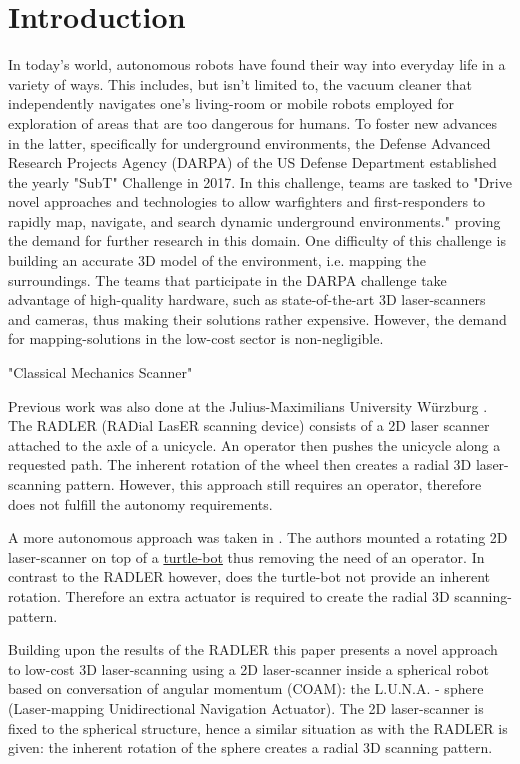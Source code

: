 \section{Introduction}
\label{sec:introduction}

In today's world, autonomous robots have found their way into everyday life in a variety of ways. This includes, but isn't limited to, the vacuum cleaner that independently navigates one's living-room or mobile robots employed for exploration of areas that are too dangerous for humans. To foster new advances in the latter, specifically for underground environments, the  Defense Advanced Research Projects Agency (DARPA) of the US Defense Department established the yearly "SubT" Challenge in 2017. In this challenge, teams are tasked to "Drive novel approaches and technologies to allow warfighters and first-responders to rapidly map, navigate, and search dynamic underground environments."  \cite{allen} proving the demand for further research in this domain. One difficulty of this challenge is building an accurate 3D model of the environment, i.e. mapping the surroundings. The teams that participate in the DARPA challenge take advantage of high-quality hardware, such as state-of-the-art 3D laser-scanners and cameras, thus making their solutions rather expensive. However, the demand for mapping-solutions in the low-cost sector is non-negligible. 

"Classical Mechanics Scanner" \cite{classical_mechanics_scanner}

Previous work was also done at the Julius-Maximilians University W\"urzburg \cite{ISER2018}. The RADLER (RADial LasER scanning device) consists of a 2D laser scanner attached to the axle of a unicycle. An operator then pushes the unicycle along a requested path. The inherent rotation of the wheel then creates a radial 3D laser-scanning pattern. However, this approach still requires an operator, therefore does not fulfill the autonomy requirements. 

A more autonomous approach was taken in \cite{3D_per_2D_based}. The authors mounted a rotating 2D laser-scanner on top of a \href{https://www.turtlebot.com}{turtle-bot} thus removing the need of an operator. In contrast to the RADLER however, does the turtle-bot not provide an inherent rotation. Therefore an extra actuator is required to create the radial 3D scanning-pattern. 

Building upon the results of the RADLER  this paper presents a novel approach to low-cost 3D laser-scanning using a 2D laser-scanner inside a spherical robot based on conversation of angular momentum (COAM): the L.U.N.A. - sphere (Laser-mapping Unidirectional Navigation Actuator). The 2D laser-scanner is fixed to the spherical structure, hence a similar situation as with the RADLER is given: the inherent rotation of the sphere creates a radial 3D scanning pattern. 
